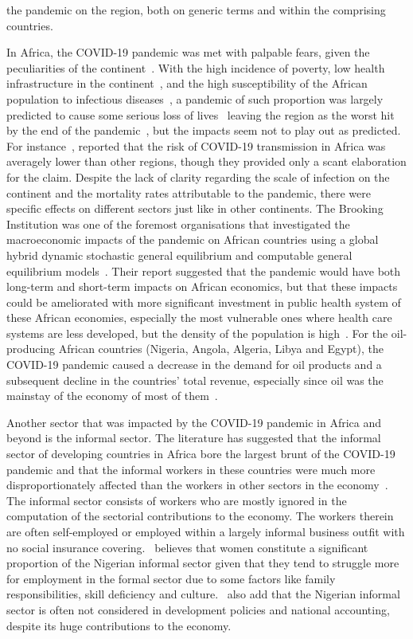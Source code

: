 \documentclass[a4paper, 12pt]{article}
\begin{document}
the pandemic on the region, both on generic terms and within the comprising countries.

    In Africa, the COVID-19 pandemic was met with palpable fears, given the peculiarities of the continent~\parencite{ohia2020covid}. With the high incidence of poverty, low health infrastructure in the continent~\parencite{castaneda2019estimating}, and the high susceptibility of the African population to infectious diseases~\parencite{lone2020covid}, a pandemic of such proportion was largely predicted to cause some serious loss of lives~\parencite{ataguba2020covid} leaving the region as the worst hit by the end of the pandemic~\parencite{ohia2020covid}, but the impacts seem not to play out as predicted. For instance~\cite{haber2020covid}, reported that the risk of COVID-19 transmission in Africa was averagely lower than other regions, though they provided only a scant elaboration for the claim. Despite the lack of clarity regarding the scale of infection on the continent and the mortality rates attributable to the pandemic, there were specific effects on different sectors just like in other continents. The Brooking Institution was one of the foremost organisations that investigated the macroeconomic impacts of the pandemic on African countries using a global hybrid dynamic stochastic general equilibrium and computable general equilibrium models~\parencite{mckibbin2021global}. Their report suggested that the pandemic would have both long-term and short-term impacts on African economics, but that these impacts could be ameliorated with more significant investment in public health system of these African economies, especially the most vulnerable ones where health care systems are less developed, but the density of the population is high~\parencite{ataguba2020covid}. For the oil-producing African countries (Nigeria, Angola, Algeria, Libya and Egypt), the COVID-19 pandemic caused a decrease in the demand for oil products and a subsequent decline in the countries’ total revenue, especially since oil was the mainstay of the economy of most of them~\parencite{ozili2021covid}.

    Another sector that was impacted by the COVID-19 pandemic in Africa and beyond is the informal sector. The literature has suggested that the informal sector of developing countries in Africa bore the largest brunt of the COVID-19 pandemic and that the informal workers in these countries were much more disproportionately affected than the workers in other sectors in the economy~\parencite{guo2022informal}. The informal sector consists of workers who are mostly ignored in the computation of the sectorial contributions to the economy. The workers therein are often self-employed or employed within a largely informal business outfit with no social insurance covering.~\cite{fapohunda2012women} believes that women constitute a significant proportion of the Nigerian informal sector given that they tend to struggle more for employment in the formal sector due to some factors like family responsibilities, skill deficiency and culture.~\cite{onwe2013role} also add that the Nigerian informal sector is often not considered in development policies and national accounting, despite its huge contributions to the economy.
\end{document}
